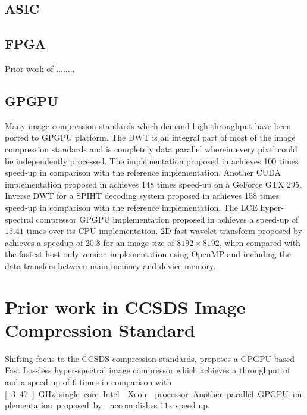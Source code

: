 \subsection{\gls{ASIC}\label{asic}}
\subsection{\gls{FPGA}\label{fpga}}
Prior work of \cite{Chang2012}....\cite{Li2013}....\cite{Manthey2014}
\subsection{\gls{GPGPU}\label{gpgpu}}
Many image compression standards which demand high throughput have been ported to \gls{GPGPU} platform. The \gls{DWT} is an integral part of most of the image compression standards and is completely data parallel wherein every pixel could be independently processed. The implementation proposed in \cite{Le2011} achieves 100 times speed-up in comparison with the reference implementation. Another CUDA implementation proposed in \cite{Matela2009} achieves 148 times speed-up on a GeForce GTX 295. Inverse \gls{DWT} for a \gls{SPIHT} decoding system proposed in \cite{Song2011} achieves 158 times speed-up in comparison with the reference implementation. The \gls{LCE} hyper-spectral compressor \gls{GPGPU} implementation proposed in \cite{Santos2012} achieves a speed-up of $15.41$ times over its \gls{CPU} implementation. 2D fast wavelet transform proposed by \cite{Franco2009} achieves a speedup of 20.8 for an image size of $8192\times8192$, when compared with the fastest host-only version implementation using OpenMP and including the data transfers between main memory and device memory.

\section{Prior work in \gls{CCSDS} Image Compression Standard\label{sec:2.5}}
Shifting focus to the \gls{CCSDS} compression standards, \cite{Keymeulen2012} proposes a \gls{GPGPU}-based Fast Lossless hyper-spectral image compressor which achieves a throughput of  and a speed-up of $6$ times in comparison with \unit[3.47]{GHz} single core Intel{\textregistered} Xeon{\texttrademark} processor. Another parallel \gls{GPGPU} implementation proposed by \cite{Hopson2012} accomplishes $11$x speed up.
